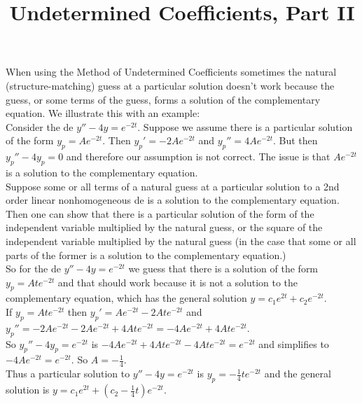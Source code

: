\documentclass{ximera}
\begin{document}
\begin{abstract}
 \end{abstract}

    \title{Undetermined Coefficients, Part II}
    
    \maketitle

 When using the Method of Undetermined Coefficients sometimes the natural (structure-matching) guess at a particular solution doesn't work because the guess, or some terms of the guess, forms a solution of the complementary equation.  We illustrate this with an example:\\

 Consider the de $y''-4y=e^{-2t}$.  Suppose we assume there is a particular solution of the form $y_p=Ae^{-2t}$.  Then $y_p'=-2Ae^{-2t}$ and $y_p''=4Ae^{-2t}$.  But then $y_p''-4y_p=0$ and therefore our assumption is not correct.  The issue is that $Ae^{-2t}$ is a solution to the complementary equation.\\

Suppose some or all terms of a natural guess at a particular solution to a 2nd order linear nonhomogeneous de is a solution to the complementary equation.  Then one can show that there is a particular solution of the form of the independent variable multiplied by the natural guess, or the square of the independent variable multiplied by the natural guess (in the case that some or all parts of the former is a solution to the complementary equation.)\\


So for the de $y''-4y=e^{-2t}$ we guess that there is a solution of the form $y_p=Ate^{-2t}$ and that should work because it is not a solution to the complementary equation, which has the general solution $y=c_1 e^{2t}+c_2 e^{-2t}$.\\

If $y_p=Ate^{-2t}$ then $y_p'=Ae^{-2t}-2Ate^{-2t}$ and \\$y_p''=-2Ae^{-2t}-2Ae^{-2t}+4Ate^{-2t}=-4Ae^{-2t}+4Ate^{-2t}$.\\

So $y_p''-4y_p=e^{-2t}$ is $-4Ae^{-2t}+4Ate^{-2t}-4Ate^{-2t}=e^{-2t}$ and simplifies to $-4Ae^{-2t}=e^{-2t}$.  So $A=-\frac{1}{4}$.\\

Thus a particular solution to $y''-4y=e^{-2t}$ is $y_p=-\frac{1}{4}te^{-2t}$ and the general solution is $y=c_1 e^{2t}+\left(c_2-\frac{1}{4}t\right)e^{-2t}$.\\
\end{document}
